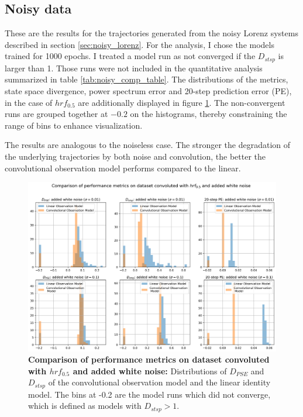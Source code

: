 \subsection{Noisy data}

These are the results for the trajectories generated from the noisy Lorenz systems described in section \ref{sec:noisy_lorenz}. 
For the analysis, I chose the models trained for 1000 epochs. I treated a model run as not converged if the 
$D_{stsp}$ is larger than 1. Those runs were not included in the quantitative analysis summarized in table \ref{tab:noisy_comp_table}. The distributions 
of the metrics, state space divergence, power spectrum error and 20-step prediction error (PE), in the case of $hrf_{0.5}$ are additionally displayed
in figure \ref{fig:Comparison_hrf_0_5_noisy}. The non-convergent runs are grouped together at $-0.2$ on the histograms, 
thereby constraining the range of bins to enhance visualization.

The results are analogous to the noiseless case. The stronger the degradation of the underlying trajectories by both noise and convolution, the better the convolutional
observation model performs compared to the linear.

   
\begin{figure}
    \includegraphics[width=\textwidth]{Images/Comparison_hrf_0_5_noisy.png}
    \caption[Comparison of performance metrics on dataset convoluted with $hrf_{0.5}$ and added white noise]
    {\textbf{Comparison of performance metrics on dataset convoluted with $hrf_{0.5}$ and added white noise: } Distributions of $D_{PSE}$ and $D_{stsp}$ of the convolutional observation model
    and the linear identity model. The bins at -0.2 are the model runs which did not converge, which is defined as models with $D_{stsp}>1$.}
    \label{fig:Comparison_hrf_0_5_noisy}
\end{figure}

